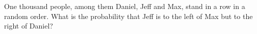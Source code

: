 One thousand people, among them Daniel, Jeff and Max, stand in a row in a random order. What is the probability that Jeff is to the left of Max but to the right of Daniel?
